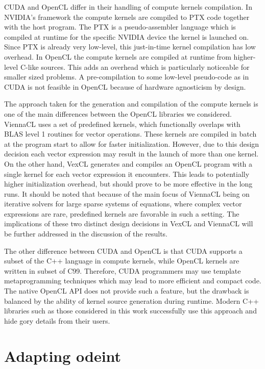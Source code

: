 \documentclass[final]{siamltex}
\begin{document}
CUDA and OpenCL differ in their handling of compute kernels compilation. In
NVIDIA's framework the compute kernels are compiled to PTX code together with
the host program. The PTX is a pseudo-assembler language which is compiled at
runtime for the specific NVIDIA device the kernel is launched on. Since PTX is already
very low-level, this just-in-time kernel compilation has low overhead. In
OpenCL the compute kernels are compiled at runtime from higher-level C-like sources.
This adds an overhead which is particularly noticeable for smaller sized
problems. A pre-compilation to some low-level pseudo-code as in CUDA is not feasible in
OpenCL because of hardware agnosticism by design.

The approach taken for the generation and compilation of the compute kernels is one of the
main differences between the OpenCL libraries we considered.
ViennaCL uses a set of predefined kernels, which functionally overlaps with BLAS level
1 routines for vector operations.
These kernels are compiled in batch at the program start to allow
for faster initialization. However, due to this design decision each vector
expression may result in the launch of more than one kernel.  On the other hand,
VexCL generates and compiles an OpenCL program with a single kernel for each
vector expression it encounters.  This leads to potentially higher
initialization overhead, but should prove to be more effective in the long
runs. It should be noted that because of the main focus of ViennaCL being on iterative
solvers for large sparse systems of equations, where complex vector
expressions are rare, predefined kernels are favorable in such a setting.
The implications of these two distinct design decisions in VexCL and ViennaCL will be further addressed in the discussion of the results.

The other difference between CUDA and OpenCL is that CUDA supports a subset of the
C++ language in compute kernels, while OpenCL kernels are written in subset of
C99. Therefore, CUDA programmers may use template metaprogramming techniques
which may lead to more efficient and compact code. The native OpenCL API does not
provide such a feature, but the drawback is balanced by the ability of
kernel source generation during runtime. Modern C++ libraries such as those considered in
this work successfully use this approach and hide gory details from their
users.




%
%
\section{Adapting odeint} \label{sec:adapting-odeint}
\end{document}
